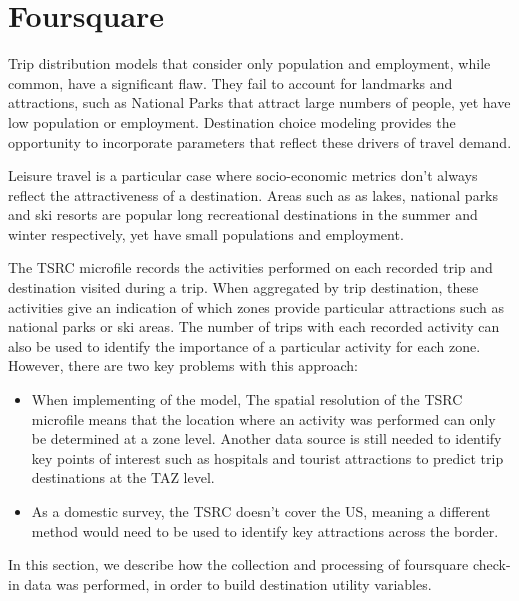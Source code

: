 \section{Foursquare}
Trip distribution models that consider only population and employment, while common, have a significant flaw. They fail to account for landmarks and attractions, such as National Parks that attract large numbers of people, yet have low population or employment. Destination choice modeling provides the opportunity to incorporate parameters that reflect these drivers of travel demand. 
	
Leisure travel is a particular case where socio-economic metrics don't always reflect the attractiveness of a destination. Areas such as as lakes, national parks and ski resorts are popular long recreational destinations in the summer and winter respectively, yet have small populations and employment. 
	
The TSRC microfile records the activities performed on each recorded trip and destination visited during a trip. When aggregated by trip destination, these activities give an indication of which zones provide particular attractions such as national parks or ski areas. The number of trips with each recorded activity can also be used to identify the importance of a particular activity for each zone. However, there are two key problems with this approach:

\begin{itemize}
\item When implementing of the model,  The spatial resolution of the TSRC microfile means that the location where an activity was performed can only be determined at a zone level. Another data source is still needed to identify key points of interest such as hospitals and tourist attractions to predict trip destinations at the TAZ level.
\item As a domestic survey, the TSRC doesn't cover the US, meaning a different method would need to be used to identify key attractions across the border.
\end{itemize}	
In this section, we describe how the collection and processing of foursquare check-in data was performed, in order to build destination utility variables.

